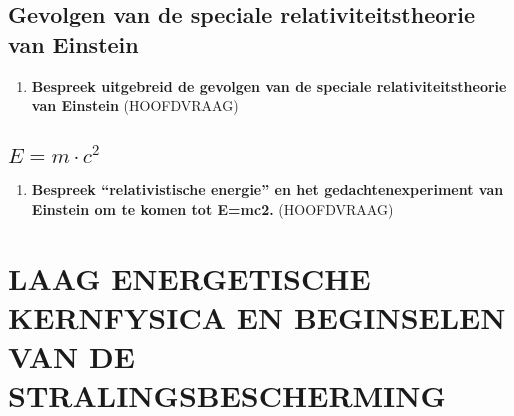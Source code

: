 \documentclass[a4paper,12pt]{article}
\begin{document}
    \subsection{Gevolgen van de speciale relativiteitstheorie van Einstein}
    \begin{enumerate}
        \item \textbf{Bespreek uitgebreid de gevolgen van de speciale relativiteitstheorie van Einstein} (HOOFDVRAAG)
    \end{enumerate}
    \subsection{$E=m \cdot c^2$}
    \begin{enumerate}
        \item \textbf{Bespreek “relativistische energie” en het gedachtenexperiment van Einstein om te komen tot E=mc2.} (HOOFDVRAAG)
    \end{enumerate}
    

    \section{LAAG ENERGETISCHE KERNFYSICA EN BEGINSELEN VAN DE STRALINGSBESCHERMING}
\end{document}
